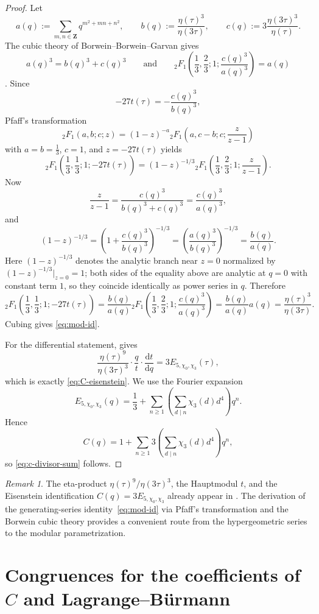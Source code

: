 \documentclass[11pt]{amsart}
\theoremstyle{remark}
\newtheorem{remark}[theorem]{Remark}
\newcommand{\Z}{\mathbf{Z}}
\newcommand{\dd}{\mathrm{d}}
\begin{document}
\begin{proof}
Let
\[
a(q):=\sum_{m,n\in\Z}q^{m^2+mn+n^2},
\qquad
b(q):=\frac{\eta(\tau)^3}{\eta(3\tau)},
\qquad
c(q):=3\frac{\eta(3\tau)^3}{\eta(\tau)}.
\]
The cubic theory of Borwein--Borwein--Garvan gives
\[
a(q)^3=b(q)^3+c(q)^3
\qquad\text{and}\qquad
{}_2F_1\!\left(\frac13,\frac23;1;\frac{c(q)^3}{a(q)^3}\right)=a(q)
\]
\cite[Theorem~2.3 and Corollary~2.4]{BBG}.
Since
\[
-27t(\tau)=-\frac{c(q)^3}{b(q)^3},
\]
Pfaff's transformation
\[
{}_2F_1(a,b;c;z)=(1-z)^{-a}{}_2F_1\!\left(a,c-b;c;\frac{z}{z-1}\right)
\]
with $a=b=\frac13$, $c=1$, and $z=-27t(\tau)$ yields
\[
{}_2F_1\!\left(\frac13,\frac13;1;-27t(\tau)\right)
=(1-z)^{-1/3}{}_2F_1\!\left(\frac13,\frac23;1;\frac{z}{z-1}\right).
\]
Now
\[
\frac{z}{z-1}
=
\frac{c(q)^3}{b(q)^3+c(q)^3}
=
\frac{c(q)^3}{a(q)^3},
\]
and
\[
(1-z)^{-1/3}
=
\left(1+\frac{c(q)^3}{b(q)^3}\right)^{-1/3}
=
\left(\frac{a(q)^3}{b(q)^3}\right)^{-1/3}
=
\frac{b(q)}{a(q)}.
\]
Here $(1-z)^{-1/3}$ denotes the analytic branch near $z=0$ normalized by
$(1-z)^{-1/3}\big|_{z=0}=1$; both sides of the equality above are analytic at $q=0$ with constant term
$1$, so they coincide identically as power series in $q$.
Therefore
\[
{}_2F_1\!\left(\frac13,\frac13;1;-27t(\tau)\right)
=
\frac{b(q)}{a(q)}
{}_2F_1\!\left(\frac13,\frac23;1;\frac{c(q)^3}{a(q)^3}\right)
=
\frac{b(q)}{a(q)}a(q)
=
\frac{\eta(\tau)^3}{\eta(3\tau)}.
\]
Cubing gives \eqref{eq:mod-id}.

For the differential statement, \cite[Example~5.2]{Moy} gives
\[
\frac{\eta(\tau)^9}{\eta(3\tau)^3}\cdot\frac{q}{t}\cdot\frac{\dd t}{\dd q}
=3E_{5,\chi_0,\chi_3}(\tau),
\]
which is exactly \eqref{eq:C-eisenstein}. We use the Fourier expansion
\[
E_{5,\chi_0,\chi_3}(q)
=
\frac13+\sum_{n\ge1}\left(\sum_{d\mid n}\chi_3(d)d^4\right)q^n.
\]
Hence
\[
C(q)=1+\sum_{n\ge1}3\left(\sum_{d\mid n}\chi_3(d)d^4\right)q^n,
\]
so \eqref{eq:c-divisor-sum} follows.
\end{proof}

\begin{remark}\label{rem:moy-precedence}
The eta-product $\eta(\tau)^9/\eta(3\tau)^3$, the Hauptmodul $t$, and the Eisenstein identification
$C(q)=3E_{5,\chi_0,\chi_3}$ already appear in \cite[Example~5.2]{Moy}. The derivation of the
generating-series identity~\eqref{eq:mod-id} via Pfaff's transformation and the Borwein cubic theory
provides a convenient route from the hypergeometric series to the modular parametrization.
\end{remark}

\section{Congruences for the coefficients of $C$ and Lagrange--B\"urmann}\label{sec:eisenstein}
\end{document}
